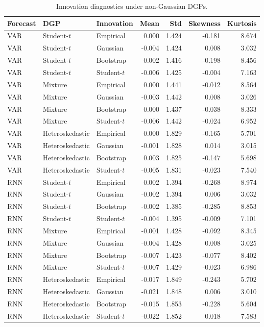 \documentclass[11pt]{article}
\begin{document}
\begin{table}[H]
\centering
\caption{Innovation diagnostics under non-Gaussian DGPs.}
\label{tab:innovation_diagnostics_summary}
\small
\begin{tabular}{lllrrrr}
\toprule
Forecast & DGP & Innovation & Mean & Std & Skewness & Kurtosis \\
\midrule
VAR & Student-\(t\) & Empirical & 0.000 & 1.424 & -0.181 & 8.674 \\
VAR & Student-\(t\) & Gaussian & -0.004 & 1.424 & 0.008 & 3.032 \\
VAR & Student-\(t\) & Bootstrap & 0.002 & 1.416 & -0.198 & 8.456 \\
VAR & Student-\(t\) & Student-\(t\) & -0.006 & 1.425 & -0.004 & 7.163 \\
\midrule
VAR & Mixture & Empirical & 0.000 & 1.441 & -0.012 & 8.564 \\
VAR & Mixture & Gaussian & -0.003 & 1.442 & 0.008 & 3.026 \\
VAR & Mixture & Bootstrap & 0.000 & 1.437 & -0.038 & 8.333 \\
VAR & Mixture & Student-\(t\) & -0.006 & 1.442 & -0.024 & 6.952 \\
\midrule
VAR & Heteroskedastic & Empirical & 0.000 & 1.829 & -0.165 & 5.701 \\
VAR & Heteroskedastic & Gaussian & -0.001 & 1.828 & 0.014 & 3.015 \\
VAR & Heteroskedastic & Bootstrap & 0.003 & 1.825 & -0.147 & 5.698 \\
VAR & Heteroskedastic & Student-\(t\) & -0.005 & 1.831 & -0.023 & 7.540 \\
\midrule
RNN & Student-\(t\) & Empirical & 0.002 & 1.394 & -0.268 & 8.974 \\
RNN & Student-\(t\) & Gaussian & -0.002 & 1.394 & 0.006 & 3.032 \\
RNN & Student-\(t\) & Bootstrap & -0.002 & 1.385 & -0.285 & 8.853 \\
RNN & Student-\(t\) & Student-\(t\) & -0.004 & 1.395 & -0.009 & 7.101 \\
\midrule
RNN & Mixture & Empirical & -0.001 & 1.428 & -0.092 & 8.345 \\
RNN & Mixture & Gaussian & -0.004 & 1.428 & 0.008 & 3.025 \\
RNN & Mixture & Bootstrap & -0.007 & 1.423 & -0.077 & 8.402 \\
RNN & Mixture & Student-\(t\) & -0.007 & 1.429 & -0.023 & 6.986 \\
\midrule
RNN & Heteroskedastic & Empirical & -0.017 & 1.849 & -0.243 & 5.702 \\
RNN & Heteroskedastic & Gaussian & -0.021 & 1.848 & 0.006 & 3.010 \\
RNN & Heteroskedastic & Bootstrap & -0.015 & 1.853 & -0.228 & 5.604 \\
RNN & Heteroskedastic & Student-\(t\) & -0.022 & 1.852 & 0.018 & 7.583 \\
\bottomrule
\end{tabular}
\end{table}
\end{document}
